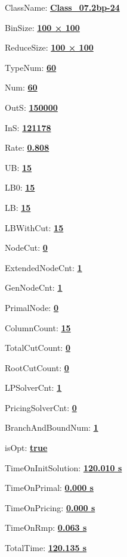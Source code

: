 \documentclass[11pt]{article}
\begin{document}
\pagestyle{empty}


ClassName: \underline{\textbf{Class_07.2bp-24}}
\par
BinSize: \underline{\textbf{100 × 100}}
\par
ReduceSize: \underline{\textbf{100 × 100}}
\par
TypeNum: \underline{\textbf{60}}
\par
Num: \underline{\textbf{60}}
\par
OutS: \underline{\textbf{150000}}
\par
InS: \underline{\textbf{121178}}
\par
Rate: \underline{\textbf{0.808}}
\par
UB: \underline{\textbf{15}}
\par
LB0: \underline{\textbf{15}}
\par
LB: \underline{\textbf{15}}
\par
LBWithCut: \underline{\textbf{15}}
\par
NodeCut: \underline{\textbf{0}}
\par
ExtendedNodeCnt: \underline{\textbf{1}}
\par
GenNodeCnt: \underline{\textbf{1}}
\par
PrimalNode: \underline{\textbf{0}}
\par
ColumnCount: \underline{\textbf{15}}
\par
TotalCutCount: \underline{\textbf{0}}
\par
RootCutCount: \underline{\textbf{0}}
\par
LPSolverCnt: \underline{\textbf{1}}
\par
PricingSolverCnt: \underline{\textbf{0}}
\par
BranchAndBoundNum: \underline{\textbf{1}}
\par
isOpt: \underline{\textbf{true}}
\par
TimeOnInitSolution: \underline{\textbf{120.010 s}}
\par
TimeOnPrimal: \underline{\textbf{0.000 s}}
\par
TimeOnPricing: \underline{\textbf{0.000 s}}
\par
TimeOnRmp: \underline{\textbf{0.063 s}}
\par
TotalTime: \underline{\textbf{120.135 s}}
\par
\newpage


\end{document}
